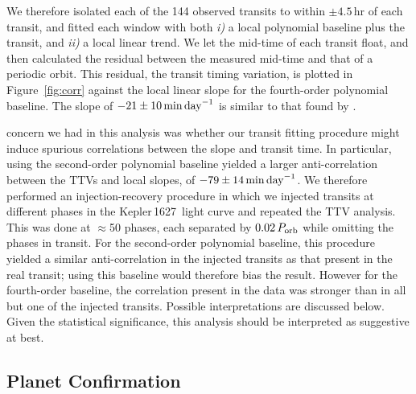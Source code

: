 \documentclass[12pt,modern,twocolumn,tighten,linenumbers]{aastex63}
\newcommand{\sn}{Kepler\,1627} %
\begin{document}
We therefore isolated each of the 144 observed transits to within
$\pm4.5$\,hr of each transit, and fitted each window with both {\it
i)} a local polynomial baseline plus the transit, and {\it ii)} a local linear
trend.  We let the mid-time of each
transit float, and then calculated the residual between the measured
mid-time and that of a periodic orbit.  This residual, the transit
timing variation, is plotted in Figure~\ref{fig:corr} against
the local linear slope for the fourth-order polynomial baseline.  The
slope of $-21 \pm 10\,{\rm min\,day}^{-1}$ is similar to that
found by \citet{holczer_time_2015}. 

 concern we had in this analysis was whether our transit fitting
procedure might induce spurious correlations between the slope and
transit time.  In particular, using the second-order polynomial
baseline yielded a larger anti-correlation between the TTVs and local
slopes, of $-79 \pm 14\,{\rm min\,day}^{-1}$.  We therefore
performed an injection-recovery procedure in which we injected
transits at different phases in the \sn\ light curve and repeated the
TTV analysis.  This was done at $\approx$50 phases, each separated by
$0.02\,P_{\rm orb}$ while omitting the phases in transit.  For
the second-order polynomial baseline, this procedure yielded
a similar anti-correlation in the injected transits as that present in the real
transit;
using this baseline would therefore bias the
result.  However for the fourth-order baseline, the correlation
present in the data was stronger than in all but one of the injected
transits.
Possible interpretations are discussed below. Given the
statistical significance, this analysis should be interpreted as
suggestive at best.


\subsection{Planet Confirmation}
\end{document}
